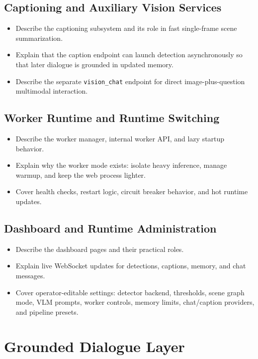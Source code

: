 \documentclass[
  digital,     %
  oneside,     %
  nosansbold,  %
  nocolorbold, %
  lof,         %
  lot,         %
]{fithesis4}
\begin{document}
\section{Captioning and Auxiliary Vision Services}
\begin{itemize}
    \item Describe the captioning subsystem and its role in fast single-frame scene summarization.
    \item Explain that the caption endpoint can launch detection asynchronously so that later dialogue is grounded in updated memory.
    \item Describe the separate \texttt{vision\_chat} endpoint for direct image-plus-question multimodal interaction.
\end{itemize}

\section{Worker Runtime and Runtime Switching}
\begin{itemize}
    \item Describe the worker manager, internal worker API, and lazy startup behavior.
    \item Explain why the worker mode exists: isolate heavy inference, manage warmup, and keep the web process lighter.
    \item Cover health checks, restart logic, circuit breaker behavior, and hot runtime updates.
\end{itemize}

\section{Dashboard and Runtime Administration}
\begin{itemize}
    \item Describe the dashboard pages and their practical roles.
    \item Explain live WebSocket updates for detections, captions, memory, and chat messages.
    \item Cover operator-editable settings: detector backend, thresholds, scene graph mode, VLM prompts, worker controls, memory limits, chat/caption providers, and pipeline presets.
\end{itemize}

\chapter{Grounded Dialogue Layer}
\end{document}
